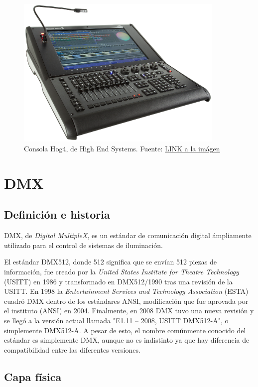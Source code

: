 \begin{figure}[!ht]
	\centering
	\includegraphics[width=10cm,scale=1]{resources/1_5-consolaHOG.png}
	\caption{Consola Hog4, de High End Systems. Fuente: \href{https://www.highend.com/products/consoles}{LINK a la imágen}}
	\label{fig:\thefigure}
\end{figure}

 

\section{DMX} \label{sec:\thesection}
\subsection{Definición e historia}
DMX, de \textit{Digital MultipleX}, es un estándar de comunicación digital ámpliamente utilizado para el control de sistemas de iluminación. 

El estándar DMX512, donde 512 significa que se envían 512 piezas de información, fue creado por la \textit{United States Institute for Theatre Technology} (USITT) en 1986 y transformado en DMX512/1990 tras una revisión de la USITT. En 1998 la \textit{Entertainment Services and Technology Association} (ESTA) cuadró DMX dentro de los estándares ANSI, modificación que fue aprovada por el instituto (ANSI) en 2004. Finalmente, en 2008 DMX tuvo una nueva revisión y se llegó a la versión actual llamada "E1.11 – 2008, USITT DMX512-A", o simplemente DMX512-A. A pesar de esto, el nombre comúnmente conocido del estándar es simplemente DMX, aunque no es indistinto ya que hay diferencia de compatibilidad entre las diferentes versiones.


\subsection{Capa física}
